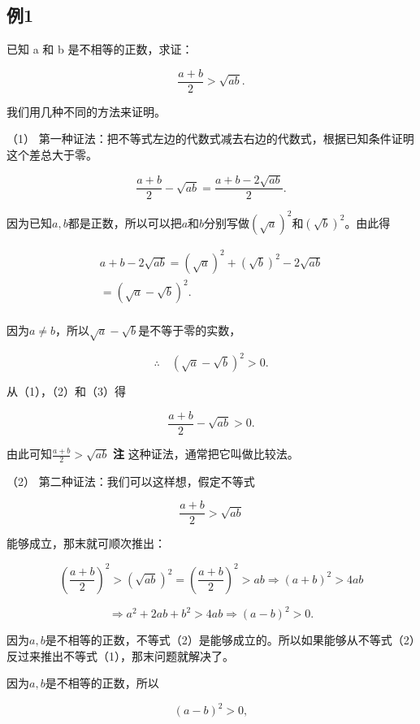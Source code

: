 \subsection{例1}

已知 a 和 b 是不相等的正数，求证：

\[
\frac{a + b}{2} > \sqrt{a b}.
\]

我们用几种不同的方法来证明。

（1）
第一种证法：把不等式左边的代数式减去右边的代数式，根据已知条件证明这个差总大于零。


\[
\frac{a + b}{2} - \sqrt{a b} = \frac{a + b - 2 \sqrt{a b}}{2}. \tag {1}
\]

因为已知\(a, b\)都是正数，所以可以把\(a\)和\(b\)分别写做\((\sqrt{a})^2\)和\((\sqrt{b})^2\)。由此得

\[
\begin{array}{l} a + b - 2 \sqrt{a b} = (\sqrt{a})^{2} + (\sqrt{b})^{2} - 2 \sqrt{a b} \\ = (\sqrt{a} - \sqrt{b})^{2}. \tag {2} \\ \end{array}
\]

因为\(a \neq b\)，所以\(\sqrt{a} - \sqrt{b}\)是不等于零的实数，

\[
\therefore \quad (\sqrt{a} - \sqrt{b})^{2} > 0. \tag {3}
\]

从（1），（2）和（3）得

\[
\frac{a + b}{2} - \sqrt{a b} > 0. \tag {4}
\]

由此可知\(\frac{a + b}{2} >\sqrt{ab}\) \textbf{注}
这种证法，通常把它叫做比较法。

（2） 第二种证法：我们可以这样想，假定不等式

\[
\frac{a + b}{2} > \sqrt{a b} \tag {1}
\]

能够成立，那末就可顺次推出：

\[
\left(\frac{a + b}{2}\right)^{2} > \left(\sqrt{a b}\right)^{2} = \left(\frac{a + b}{2}\right)^{2} > a b \Rightarrow (a + b)^{2} > 4 a b
\]

\[
\Rightarrow a^{2} + 2 a b + b^{2} > 4 a b \Rightarrow (a - b)^{2} > 0. \tag {2}
\]

因为\(a, b\)是不相等的正数，不等式（2）是能够成立的。所以如果能够从不等式（2）反过来推出不等式（1），那末问题就解决了。

 因为\(a, b\)是不相等的正数，所以

\[
(a - b)^{2} > 0,
\]

